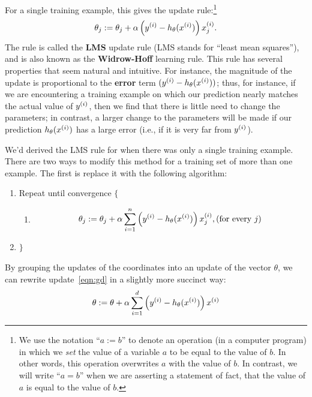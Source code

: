 \documentclass{article}
\begin{document}
For a single training example, this gives the update rule:\footnote{We use the
notation ``$a := b$'' to denote an operation (in a computer program) in
which we \emph{set} the value of a variable $a$ to be equal to the value of $b$.  In other
words, this operation overwrites $a$ with the value of $b$.  In contrast, we will
write ``$a = b$'' when we are asserting a statement of fact, that the value of $a$ is
equal to the value of $b$.}
\[
\theta_j := \theta_j + \alpha \left(\ysi - h_\theta(\xsi)\right) x^{(i)}_j.  %
\]
The rule is called the {\bf LMS} update rule (LMS stands for ``least mean squares''),
and is also known as the {\bf Widrow-Hoff} learning rule.
This rule has several properties that seem natural and intuitive. For instance, the
magnitude of the update is proportional to
the {\bf error} term
$({y^{(i)}} - h_\theta({x^{(i)}}))$; thus, for instance, if we are encountering a training
example on which our prediction nearly matches the actual value of ${y^{(i)}}$,
then we find that there is little need to change the parameters; in contrast,
a larger change to the parameters will be made if our prediction
$h_\theta({x^{(i)}})$ has a large error (i.e., if it is very far from ${y^{(i)}}$).

We'd derived the LMS rule for when there was only a single training example.  There are two
ways to modify this method for a training set of more than one example.  The first is
replace it with the following algorithm:
\begin{enumerate}
\item[] Repeat until convergence $\{$
\begin{enumerate}
\item[]\begin{align}\theta_j := \theta_j + \alpha \sum_{i=1}^{n} \left({y^{(i)}} - h_\theta({x^{(i)}})\right) x^{(i)}_j, \textup{(for every $j$)}\label{eqn:gd}\end{align}
\end{enumerate}
\item[] $\}$
\end{enumerate}

By grouping the updates of the coordinates into an update of the vector $\theta$, we can rewrite update~\eqref{eqn:gd} in a slightly more succinct way:
\begin{align}
\theta := \theta + \alpha \sum_{i=1}^{d} \left({y^{(i)}} - h_\theta({x^{(i)}})\right) x^{(i)} \nonumber
\end{align}
\end{document}
